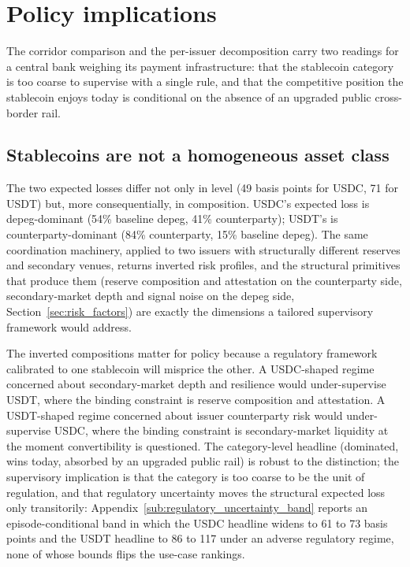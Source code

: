 \section{Policy implications}\label{sec:discussion}

The corridor comparison and the per-issuer decomposition carry two readings for a central bank weighing its payment infrastructure: that the stablecoin category is too coarse to supervise with a single rule, and that the competitive position the stablecoin enjoys today is conditional on the absence of an upgraded public cross-border rail.

\subsection{Stablecoins are not a homogeneous asset class}\label{sub:not_homogeneous}\label{sub:policy_implications}

The two expected losses differ not only in level (49 basis points for USDC, 71 for USDT) but, more consequentially, in composition. USDC's expected loss is depeg-dominant (54\% baseline depeg, 41\% counterparty); USDT's is counterparty-dominant (84\% counterparty, 15\% baseline depeg). The same coordination machinery, applied to two issuers with structurally different reserves and secondary venues, returns inverted risk profiles, and the structural primitives that produce them (reserve composition and attestation on the counterparty side, secondary-market depth and signal noise on the depeg side, Section~\ref{sec:risk_factors}) are exactly the dimensions a tailored supervisory framework would address.

The inverted compositions matter for policy because a regulatory framework calibrated to one stablecoin will misprice the other. A USDC-shaped regime concerned about secondary-market depth and resilience would under-supervise USDT, where the binding constraint is reserve composition and attestation. A USDT-shaped regime concerned about issuer counterparty risk would under-supervise USDC, where the binding constraint is secondary-market liquidity at the moment convertibility is questioned. The category-level headline (dominated, wins today, absorbed by an upgraded public rail) is robust to the distinction; the supervisory implication is that the category is too coarse to be the unit of regulation, and that regulatory uncertainty moves the structural expected loss only transitorily: Appendix~\ref{sub:regulatory_uncertainty_band} reports an episode-conditional band in which the USDC headline widens to 61 to 73 basis points and the USDT headline to 86 to 117 under an adverse regulatory regime, none of whose bounds flips the use-case rankings.

